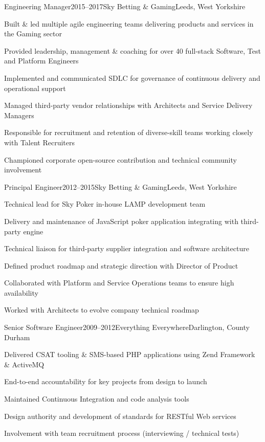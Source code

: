 \documentclass{cv}
\begin{document}

\begin{experience}{Engineering Manager}{2015--2017}{Sky Betting \& Gaming}{Leeds, West Yorkshire}
\item Built \& led multiple agile engineering teams delivering products and services in the Gaming sector
\item Provided leadership, management \& coaching for over 40 full-stack Software, Test and Platform Engineers
\item Implemented and communicated SDLC for governance of continuous delivery and operational support
\item Managed third-party vendor relationships with Architects and Service Delivery Managers
\item Responsible for recruitment and retention of diverse-skill teams working closely with Talent Recruiters
\item Championed corporate open-source contribution and technical community involvement
\end{experience}


\begin{experience}{Principal Engineer}{2012--2015}{Sky Betting \& Gaming}{Leeds, West Yorkshire}
\item Technical lead for Sky Poker in-house LAMP development team
\item Delivery and maintenance of JavaScript poker application integrating with third-party engine
\item Technical liaison for third-party supplier integration and software architecture
\item Defined product roadmap and strategic direction with Director of Product
\item Collaborated with Platform and Service Operations teams to ensure high availability
\item Worked with Architects to evolve company technical roadmap
\end{experience}


\begin{experience}{Senior Software Engineer}{2009--2012}{Everything Everywhere}{Darlington, County Durham}
\item Delivered CSAT tooling \& SMS-based PHP applications using Zend Framework \& ActiveMQ
\item End-to-end accountability for key projects from design to launch
\item Maintained Continuous Integration and code analysis tools
\item Design authority and development of standards for RESTful Web services
\item Involvement with team recruitment process (interviewing / technical tests)
\end{experience}
\end{document}
